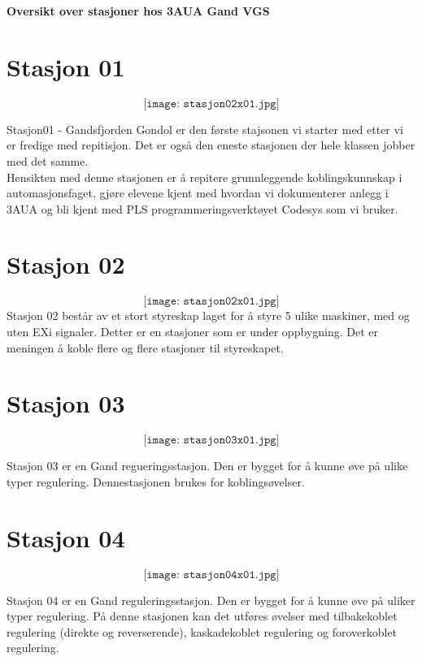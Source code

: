 
\noindent
\begin{center}
{\bf Oversikt over stasjoner hos 3AUA Gand VGS }
\end{center}
\vskip 5pt
\section{Stasjon 01}

$$\texttt{[image: stasjon02x01.jpg]}$$

Stasjon01 - Gandsfjorden Gondol er den første stajsonen vi starter med etter vi er fredige med repitisjon. Det er også den eneste stasjonen der hele klassen jobber med det samme. \\

Hensikten med denne stasjonen er å repitere grunnleggende koblingskunnskap i automasjonsfaget, gjøre elevene kjent med hvordan vi dokumenterer anlegg i 3AUA og bli kjent med PLS programmeringsverktøyet Codesys som vi bruker. 
\section{Stasjon 02}

$$\texttt{[image: stasjon02x01.jpg]}$$
Stasjon 02 består av et stort styreskap laget for å styre 5 ulike maskiner, med og uten EXi signaler. Detter er en stasjoner som er under oppbygning. Det er meningen å koble flere og flere stasjoner til  styreskapet. \\




\section{Stasjon 03}

$$\texttt{[image: stasjon03x01.jpg]}$$

Stasjon 03 er en Gand regueringsstasjon. Den er bygget for å kunne øve på ulike typer regulering. Dennestasjonen brukes for koblingsøvelser.

\section{Stasjon 04}

$$\texttt{[image: stasjon04x01.jpg]}$$

Stasjon 04 er en Gand reguleringsstasjon. Den er bygget for å kunne øve på uliker typer regulering. På denne stasjonen kan det utføres øvelser med tilbakekoblet regulering (direkte og reverserende), kaskadekoblet regulering og foroverkoblet regulering. 
